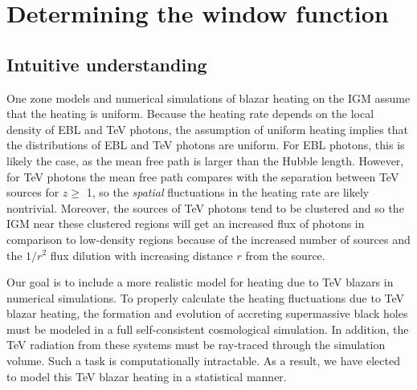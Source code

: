 \documentclass[numberedappendix]{emulateapj}
\begin{document}
\section {Determining the window function}\label{window}
\subsection{Intuitive understanding}
One zone models \citep{2012ApJ...752...23C,2012ApJ...752...24P} and numerical simulations \citep{2012MNRAS.423..149P} of blazar heating on the IGM assume that the heating is uniform. Because the heating rate depends on the local density of EBL and TeV photons, the assumption of uniform heating implies that the distributions of EBL and TeV photons are uniform. For EBL photons, this is likely the case, as the mean free path is larger than the Hubble length. However, for TeV photons the mean free path compares with the separation between TeV sources for $z\geqslant$ 1, so the {\it spatial} fluctuations in the heating rate are likely nontrivial. Moreover, the sources of TeV photons tend to be clustered and so the IGM near these clustered regions will get an increased flux of photons in comparison to low-density regions because of the increased number of sources and the $1/r^2$ flux dilution with increasing distance $r$ from the source.

Our goal is to include a more realistic model for heating due to TeV blazars in numerical simulations.
To properly calculate the heating fluctuations due to TeV blazar heating, the formation and evolution of accreting supermassive black holes must be modeled in a full self-consistent cosmological simulation. In addition, the TeV radiation from these systems must be ray-traced through the simulation volume. Such a task is computationally intractable. As a result, we have elected to model this TeV blazar heating in a statistical manner.
\end{document}
